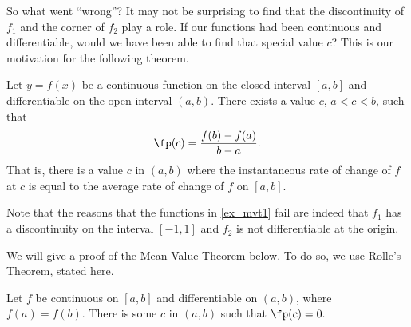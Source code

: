 So what went ``wrong\primeskip''?  It may not be surprising to find that the discontinuity of $f_1$ and the corner of $f_2$ play a role.  If our functions had been continuous and differentiable, would we have been able to find that special value $c$? This is our motivation for the following theorem.


{Let $y=f(x)$ be a continuous function on the closed interval $[a,b]$ and differentiable on the open interval $(a,b)$. There exists a value $c$, $a < c < b$, such that 
\[\fp(c) = \frac{f(b)-f(a)}{b-a}.\]
That is, there is a value $c$ in $(a,b)$ where the instantaneous rate of change of $f$ at $c$ is equal to the average rate of change of $f$ on $[a,b]$.}

Note that the reasons that the functions in \autoref{ex_mvt1} fail are indeed that $f_1$ has a discontinuity on the interval $[-1,1]$ and $f_2$ is not differentiable at the origin.\bigskip

We will give a proof of the Mean Value Theorem below. To do so, we use Rolle's Theorem, stated here.

{Let $f$ be continuous on $[a,b]$ and differentiable on $(a,b)$, where $f(a) = f(b)$. There is some $c$ in $(a,b)$ such that $\fp(c) = 0.$}

